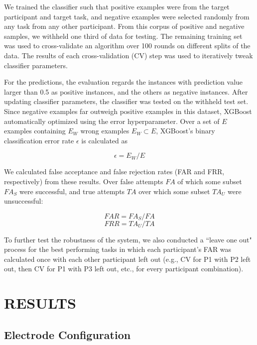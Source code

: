\documentclass[a4paper,twoside]{article}
\begin{document}
We trained the classifier such that positive examples were from the target participant and target task, and negative examples were selected randomly from any task from any other participant. From this corpus of positive and negative samples, we withheld one third of data for testing. The remaining training set was used to cross-validate an algorithm over 100 rounds on different splits of the data. The results of each cross-validation (CV) step was used to iteratively tweak classifier parameters. 

For the predictions, the evaluation regards the instances with prediction value larger than 0.5 as positive instances, and the others as negative instances. After updating classifier parameters, the classifier was tested on the withheld test set. Since negative examples far outweigh positive examples in this dataset, XGBoost automatically optimized using the error hyperparameter. Over a set of \(E\) examples containing \(E_W\) wrong examples \(E_W\subset{E}\), XGBoost's binary classification error rate \(\epsilon\) is calculated as

\begin{equation}\label{eq1}
     \epsilon = E_W / E
\end{equation}

We calculated false acceptance and false rejection rates (FAR and FRR, respectively) from these results. Over false attempts \(FA\) of which some subset \(FA_S\) were successful, and true attempts \(TA\) over which some subset \(TA_U\) were unsuccessful:

\begin{equation}\label{eq2}
     FAR = FA_S / FA
\end{equation}
\begin{equation}\label{eq3}
     FRR = TA_U / TA
\end{equation}

To further test the robustness of the system, we also conducted a ``leave one out" process for the best performing tasks in which each participant's FAR was calculated once with each other participant left out (e.g., CV for P1 with P2 left out, then CV for P1 with P3 left out, etc., for every participant combination).

\section{\uppercase{Results}}
\label{sec:Results}
\subsection{Electrode Configuration}
\end{document}
